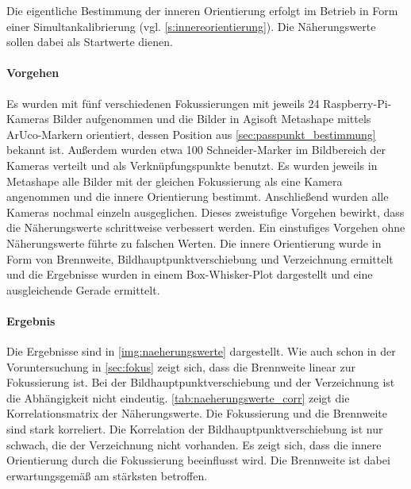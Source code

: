 \documentclass[./00PhotoBox.tex]{subfiles}
\begin{document}
Die eigentliche Bestimmung der inneren Orientierung erfolgt im Betrieb in Form einer Simultankalibrierung (vgl. \autoref{s:innereorientierung}). Die Näherungswerte sollen dabei als Startwerte dienen.

\paragraph{Vorgehen}

Es wurden mit fünf verschiedenen Fokussierungen mit jeweils 24 Rasp\-berry-Pi-Kameras Bilder aufgenommen und die Bilder in Agisoft Metashape mittels ArUco-Markern orientiert, dessen Position aus \autoref{sec:passpunkt_bestimmung} bekannt ist. Außerdem wurden etwa 100 Schneider-Marker im Bildbereich der Kameras verteilt und als Verknüpfungspunkte benutzt. Es wurden jeweils in Metashape alle Bilder mit der gleichen Fokussierung als eine Kamera angenommen und die innere Orientierung bestimmt. Anschließend wurden alle Kameras nochmal einzeln ausgeglichen. Dieses zweistufige Vorgehen bewirkt, dass die Näherungswerte schrittweise verbessert werden. Ein einstufiges Vorgehen ohne Näherungswerte führte zu falschen Werten. Die innere Orientierung wurde in Form von Brennweite, Bildhauptpunktverschiebung und Verzeichnung ermittelt und die Ergebnisse wurden in einem Box-Whisker-Plot dargestellt und eine ausgleichende Gerade ermittelt.

\paragraph{Ergebnis}

Die Ergebnisse sind in \autoref{img:naeherungswerte} dargestellt. Wie auch schon in der Voruntersuchung in \autoref{sec:fokus} zeigt sich, dass die Brennweite linear zur Fokussierung ist. Bei der Bildhauptpunktverschiebung und der Verzeichnung ist die Abhängigkeit nicht eindeutig. \autoref{tab:naeherungswerte_corr} zeigt die Korrelationsmatrix der Näherungswerte. Die Fokussierung und die Brennweite sind stark korreliert. Die Korrelation der Bildhauptpunktverschiebung ist nur schwach, die der Verzeichnung nicht vorhanden. Es zeigt sich, dass die innere Orientierung durch die Fokussierung beeinflusst wird. Die Brennweite ist dabei erwartungsgemäß am stärksten betroffen.
\end{document}
